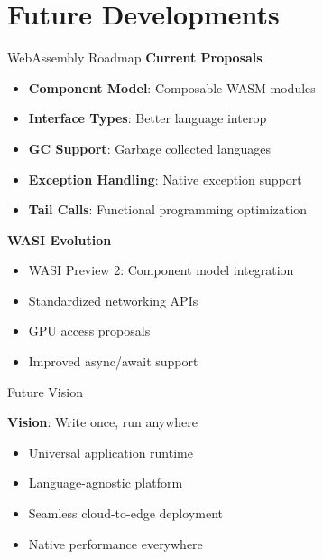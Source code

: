 \documentclass[11pt,aspectratio=169]{beamer}
\begin{document}
\section{Future Developments}

\begin{frame}{WebAssembly Roadmap}
\textbf{Current Proposals}
\begin{itemize}
    \item \textbf{Component Model}: Composable WASM modules
    \item \textbf{Interface Types}: Better language interop
    \item \textbf{GC Support}: Garbage collected languages
    \item \textbf{Exception Handling}: Native exception support
    \item \textbf{Tail Calls}: Functional programming optimization
\end{itemize}

\textbf{WASI Evolution}
\begin{itemize}
    \item WASI Preview 2: Component model integration
    \item Standardized networking APIs
    \item GPU access proposals
    \item Improved async/await support
\end{itemize}
\end{frame}

\begin{frame}{Future Vision}
\begin{center}
\end{center}

\textbf{Vision}: Write once, run anywhere
\begin{itemize}
    \item Universal application runtime
    \item Language-agnostic platform
    \item Seamless cloud-to-edge deployment
    \item Native performance everywhere
\end{itemize}
\end{frame}
\end{document}
